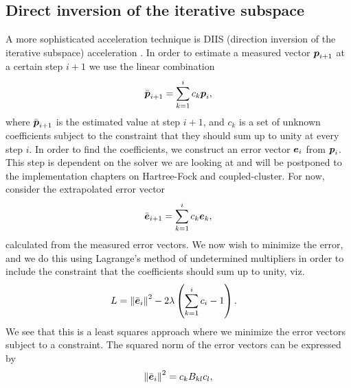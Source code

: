         \subsection{Direct inversion of the iterative subspace}
            \label{subsec:diis}
            A more sophisticated acceleration technique is DIIS (direction
            inversion of the iterative subspace) acceleration
            \cite{pulay1980393, pulay1982, helgaker-molecular, shepard-diis}.
            In order to estimate a measured vector $\boldsymbol{p}_{i + 1}$ at a
            certain step $i + 1$ we use the linear combination
            \begin{align}
                \bar{\boldsymbol{p}}_{i + 1} = \sum_{k = 1}^{i} c_k \boldsymbol{p}_{i},
                \label{eq:diis-estimate}
            \end{align}
            where $\bar{\boldsymbol{p}}_{i + 1}$ is the estimated value at step $i +
            1$, and $c_k$ is a set of unknown coefficients subject to the
            constraint that they should sum up to unity at every step $i$.
            In order to find the coefficients, we construct an error vector
            $\boldsymbol{e}_i$ from $\boldsymbol{p}_i$.
            This step is dependent on the solver we are looking at and will be
            postponed to the implementation chapters on Hartree-Fock and
            coupled-cluster.
            For now, consider the extrapolated error vector
            \begin{align}
                \bar{\boldsymbol{e}}_{i + 1}
                = \sum_{k = 1}^{i} c_k \boldsymbol{e}_k,
            \end{align}
            calculated from the measured error vectors.
            We now wish to minimize the error, and we do this using Lagrange's
            method of undetermined multipliers in order to include the
            constraint that the coefficients should sum up to unity, viz.
            \begin{align}
                L &=  \norm{\bar{\boldsymbol{e}}_i}^2
                - 2\lambda\left( 
                    \sum_{k = 1}^{i} c_i
                    - 1
                 \right).
                \label{eq:diis-lagrangian}
            \end{align}
            We see that this is a least squares approach where we minimize the
            error vectors subject to a constraint.
            The squared norm of the error vectors can be expressed by
            \begin{align}
                \norm{\bar{\boldsymbol{e}}_i}^2
                = c_k B_{kl} c_l,
            \end{align}
